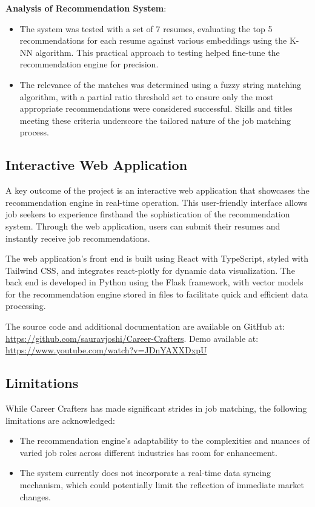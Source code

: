 \documentclass[a4paper,10pt]{article}
\begin{document}
\textbf{Analysis of Recommendation System}:
\begin{itemize}
 \item The system was tested with a set of 7 resumes, evaluating the top 5 recommendations for each resume against various embeddings using the K-NN algorithm. This practical approach to testing helped fine-tune the recommendation engine for precision.

 \item The relevance of the matches was determined using a fuzzy string matching algorithm, with a partial ratio threshold set to ensure only the most appropriate recommendations were considered successful. Skills and titles meeting these criteria underscore the tailored nature of the job matching process.

\end{itemize}

\subsection{Interactive Web Application}

A key outcome of the project is an interactive web application that showcases the recommendation engine in real-time operation. This user-friendly interface allows job seekers to experience firsthand the sophistication of the recommendation system. Through the web application, users can submit their resumes and instantly receive job recommendations.

The web application's front end is built using React with TypeScript, styled with Tailwind CSS, and integrates react-plotly for dynamic data visualization. The back end is developed in Python using the Flask framework, with vector models for the recommendation engine stored in files to facilitate quick and efficient data processing.

The source code and additional documentation are available on GitHub at: \href{https://github.com/sauravjoshi/Career-Crafters}{https://github.com/sauravjoshi/Career-Crafters}. Demo available at: \url{https://www.youtube.com/watch?v=JDnYAXXDxpU}

\subsection{Limitations}
While Career Crafters has made significant strides in job matching, the following limitations are acknowledged:
\begin{itemize}
  \item The recommendation engine's adaptability to the complexities and nuances of varied job roles across different industries has room for enhancement.
  \item The system currently does not incorporate a real-time data syncing mechanism, which could potentially limit the reflection of immediate market changes.
\end{itemize}
\end{document}
